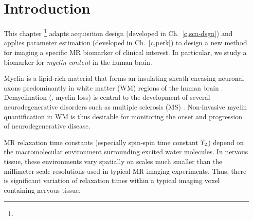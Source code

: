 
\section{Introduction}
\label{s,mwf,intro}

This chapter
\footnote{%
%
} 
adapts acquisition design 
(developed in Ch.~\ref{c,scn-dsgn})
and applies parameter estimation 
(developed in Ch.~\ref{c,perk})
to design a new method
for imaging a specific MR biomarker
of clinical interest.
In particular,
we study a biomarker 
for \emph{myelin content} 
in the human brain.

Myelin is a lipid-rich material
that forms an insulating sheath
encasing neuronal axons 
predominantly in white matter (WM) regions
of the human brain
\cite{morell:84}.
Demyelination (\ie, myelin loss) is central
to the development 
of several neurodegenerative disorders
such as multiple sclerosis (MS)
\cite{goldenberg:12:msr}. 
Non-invasive myelin quantification in WM
is thus desirable 
for monitoring the onset and progression
of neurodegenerative disease.

MR relaxation time constants
(especially spin-spin time constant $T_2$)
depend on the macromolecular environment
surrounding excited water molecules.
In nervous tissue,
these environments vary spatially
on scales much smaller 
than the millimeter-scale resolutions
used in typical MR imaging experiments.
Thus, 
there is significant variation
of relaxation times 
within a typical imaging voxel 
containing nervous tissue.

